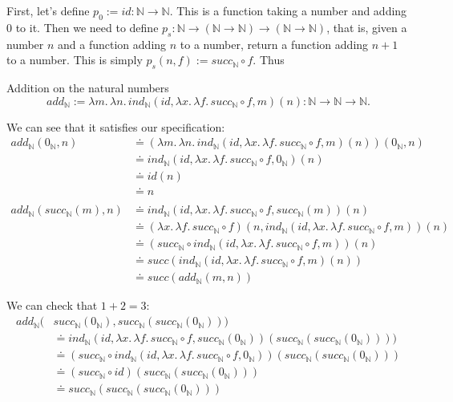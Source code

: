 \documentclass[a4paper, 12pt]{article}
\newcommand{\N}{\mathbb{N}}
\newcommand{\la}[1]{\lambda{#1}.\,}
\theoremstyle{changedot}
\theoremstyle{changedotbreak}
\theoremstyle{nonumberplain}
\begin{document}
First, let's define $p_{0} := id : \N \to \N$. This is a function taking a number and adding 0 to it. Then we need to define $p_{s} : \N \to (\N \to \N) \to (\N \to \N)$, that is, given a number $n$ and a function adding $n$ to a number, return a function adding $n+1$ to a number. This is simply $p_{s}(n, f) := succ_{\N} \circ f$. Thus

\begin{definition}
  Addition on the natural numbers
  \[add_{\N} := \la m \la n ind_{\N}(id, \la x \la f succ_{\N} \circ f, m)(n) : \N \to \N \to \N.\]
\end{definition}

We can see that it satisfies our specification:
\begin{align*}
  add_{\N}(0_{\N}, n) &\doteq (\la m \la n ind_{\N}(id, \la x \la f succ_{\N} \circ f, m)(n))(0_{\N}, n) \\
  &\doteq ind_{\N}(id, \la x \la f succ_{\N} \circ f, 0_{\N})(n) \\
                 &\doteq id(n) \\
                 &\doteq n \\ \\
  add_{\N}(succ_{\N}(m), n) &\doteq ind_{\N}(id, \la x \la f succ_{\N} \circ f, succ_{\N}(m))(n) \\
                 &\doteq (\la x \la f succ_{\N} \circ f)(n, ind_{\N}(id, \la x \la f succ_{\N} \circ f, m))(n) \\
                 &\doteq (succ_{\N} \circ ind_{\N}(id, \la x \la f succ_{\N} \circ f, m))(n) \\
                 &\doteq succ(ind_{\N}(id, \la x \la f succ_{\N} \circ f, m)(n)) \\
  &\doteq succ(add_{\N}(m, n))
\end{align*}

We can check that $1+2=3$:
\begin{align*}
  add_{\N}(&succ_{\N}(0_{\N}), succ_{\N}(succ_{\N}(0_{\N}))) \\
           &\doteq ind_{\N}(id, \la x \la f succ_{\N} \circ f, succ_{\N}(0_{\N}))(succ_{\N}(succ_{\N}(0_{\N})))) \\
  &\doteq (succ_{\N}\circ ind_{\N}(id, \la x \la f succ_{\N} \circ f, 0_{\N}))(succ_{\N}(succ_{\N}(0_{\N}))) \\
           &\doteq (succ_{\N} \circ id)(succ_{\N}(succ_{\N}(0_{\N}))) \\
  &\doteq succ_{\N}(succ_{\N}(succ_{\N}(0_{\N})))
\end{align*}
\end{document}
